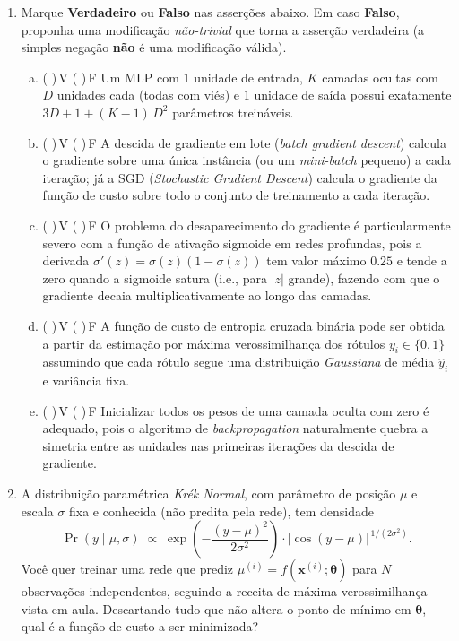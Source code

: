 \documentclass{dlproblemset}
\begin{document}
\begin{enumerate}[1)]
    \item Marque \textbf{Verdadeiro} ou \textbf{Falso} nas asserções abaixo. Em caso \textbf{Falso}, proponha uma modificação \emph{não-trivial} que torna a asserção verdadeira (a simples negação \textbf{não} é uma modificação válida).
    \begin{enumerate}[a)]
        \item ( )\,V \quad ( )\,F \quad Um MLP com $1$ unidade de entrada, $K$ camadas ocultas com $D$ unidades cada (todas com viés) e $1$ unidade de saída possui exatamente $3D + 1 + (K - 1)\,D^2$ parâmetros treináveis.
        \item ( )\,V \quad ( )\,F \quad A descida de gradiente em lote (\textit{batch gradient descent}) calcula o gradiente sobre uma única instância (ou um \textit{mini-batch} pequeno) a cada iteração; já a SGD (\textit{Stochastic Gradient Descent}) calcula o gradiente da função de custo sobre todo o conjunto de treinamento a cada iteração.
        \item ( )\,V \quad ( )\,F \quad O problema do desaparecimento do gradiente é particularmente severo com a função de ativação sigmoide em redes profundas, pois a derivada $\sigma'(z) = \sigma(z)(1-\sigma(z))$ tem valor máximo $0.25$ e tende a zero quando a sigmoide satura (i.e., para $|z|$ grande), fazendo com que o gradiente decaia multiplicativamente ao longo das camadas.
        \item ( )\,V \quad ( )\,F \quad A função de custo de entropia cruzada binária pode ser obtida a partir da estimação por máxima verossimilhança dos rótulos $y_i \in \{0, 1\}$ assumindo que cada rótulo segue uma distribuição \emph{Gaussiana} de média $\hat{y}_i$ e variância fixa.
        \item ( )\,V \quad ( )\,F \quad Inicializar todos os pesos de uma camada oculta com zero é adequado, pois o algoritmo de \textit{backpropagation} naturalmente quebra a simetria entre as unidades nas primeiras iterações da descida de gradiente.
    \end{enumerate}

    \item A distribuição paramétrica \textit{Krék Normal}, com parâmetro de posição $\mu$ e escala $\sigma$ fixa e conhecida (não predita pela rede), tem densidade
    \[
    \Pr(y \mid \mu, \sigma) \;\propto\;
    \exp\!\left(-\frac{(y - \mu)^2}{2\sigma^2}\right) \cdot
    \bigl|\cos(y - \mu)\bigr|^{\,1/(2\sigma^2)} .
    \]
    Você quer treinar uma rede que prediz $\mu^{(i)} = f(\mathbf{x}^{(i)}; \boldsymbol{\theta})$ para $N$ observações independentes, seguindo a receita de máxima verossimilhança vista em aula. Descartando tudo que não altera o ponto de mínimo em $\boldsymbol{\theta}$, qual é a função de custo a ser minimizada?


\end{enumerate}
\end{document}
